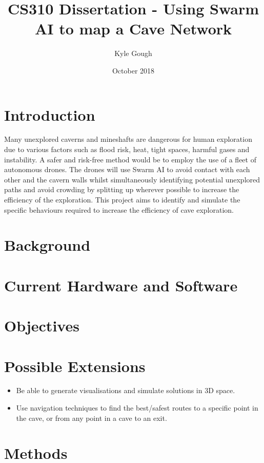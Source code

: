 \documentclass{article}
\title{CS310 Dissertation - Using Swarm AI to map a Cave Network}
\author{Kyle Gough}
\date{October 2018}
\begin{document}
\maketitle

\tableofcontents

\section{Introduction}

Many unexplored caverns and mineshafts are dangerous for human exploration due to various factors such as flood risk, heat, tight spaces, harmful gases and instability. A safer and risk-free method would be to employ the use of a fleet of autonomous drones. The drones will use Swarm AI to avoid contact with each other and the cavern walls whilst simultaneously identifying potential unexplored paths and avoid crowding by splitting up wherever possible to increase the efficiency of the exploration. This project aims to identify and simulate the specific behaviours required to increase the efficiency of cave exploration.

\section{Background}

\section{Current Hardware and Software}

\section{Objectives}

\section{Possible Extensions}

\begin{itemize}
    \item Be able to generate visualisations and simulate solutions in 3D space.
    \item Use navigation techniques to find the best/safest routes to a specific point in the cave, or from any point in a cave to an exit.
\end{itemize}

\section{Methods}
\end{document}
